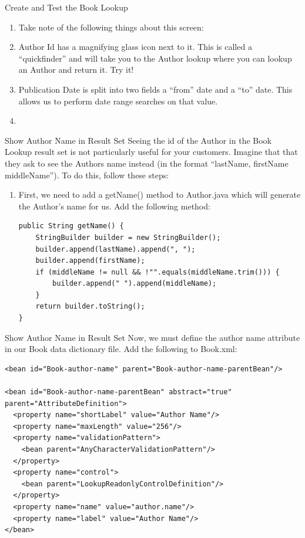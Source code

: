 \documentclass[xcolor=dvipsnames,14pt,professionalfonts]{beamer}
\begin{document}
          \begin{frame}{Create and Test the Book Lookup}
            \begin{enumerate}
            \item Take note of the following things about this screen:
              \item Author Id has a magnifying glass icon next to it.  This is called a “quickfinder” and will take you to the Author lookup where you can lookup an Author and return it.  Try it!
              \item Publication Date is split into two fields a “from”
                date and a “to” date.  This allows us to perform date
                range searches on that value.
              \item 
              \end{enumerate}
            \end{frame}
\begin{frame}[fragile]{Show Author Name in Result Set}
Seeing the id of the Author in the Book Lookup result set is not particularly useful for your customers.  Imagine that that they ask to see the Authors name instead (in the format “lastName, firstName middleName”).  To do this, follow these steps:
              \begin{enumerate}
              \item First, we need to add a getName() method to Author.java which will generate the Author’s name for us.  Add the following method:
    \begin{verbatim}
public String getName() {
	StringBuilder builder = new StringBuilder();
	builder.append(lastName).append(", ");
	builder.append(firstName);
	if (middleName != null && !"".equals(middleName.trim())) {
		builder.append(" ").append(middleName);
	}
	return builder.toString();
}
    \end{verbatim}
    \end{enumerate}
\end{frame}

\begin{frame}[fragile]{Show Author Name in Result Set}
Now, we must define the author name attribute in our Book data dictionary file.  Add the following to Book.xml:
    \begin{verbatim}
<bean id="Book-author-name" parent="Book-author-name-parentBean"/>

<bean id="Book-author-name-parentBean" abstract="true" parent="AttributeDefinition">
  <property name="shortLabel" value="Author Name"/>
  <property name="maxLength" value="256"/>
  <property name="validationPattern">
    <bean parent="AnyCharacterValidationPattern"/>
  </property>
  <property name="control">
    <bean parent="LookupReadonlyControlDefinition"/>
  </property>
  <property name="name" value="author.name"/>
  <property name="label" value="Author Name"/>
</bean>
    \end{verbatim}
\end{frame}
\end{document}
